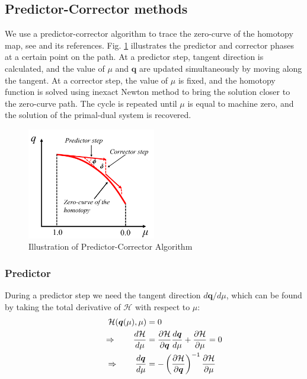 \documentclass{article}
\theoremstyle{definition}
\begin{document}



\subsection{Predictor-Corrector methods}
We use a predictor-corrector algorithm to trace the zero-curve of the homotopy map, see \cite{allgower_georg_1993} and its references. Fig. \ref{fig:pc} illustrates the predictor and corrector phases at a certain point on the path. At a predictor step, tangent direction is calculated, and the value of $\mu$ and $\boldsymbol{q}$ are updated simultaneously by moving along the tangent. At a corrector step, the value of $\mu$ is fixed, and the homotopy function is solved using inexact Newton method to bring the solution closer to the zero-curve path. The cycle is repeated until $\mu$ is equal to machine zero, and the solution of the primal-dual system is recovered.

\begin{figure}[H]
  \centering
  \includegraphics[width=0.5\textwidth]{./figs/PC_graph.png}
  \caption{Illustration of Predictor-Corrector Algorithm}
  \label{fig:pc}
\end{figure}

\subsubsection{Predictor}
During a predictor step we need the tangent direction $d\boldsymbol{q}/d\mu$, which can be found by taking the total derivative of $\mathcal{H}$ with respect to $\mu$:
\begin{align}\label{eq:pctan}
\ \ \qquad \mathcal{H}(\boldsymbol{q}(\mu), \mu) &= 0 \notag \\
\Rightarrow \qquad \frac{d \mathcal{H} }{d \mu} &= 
\frac{\partial \mathcal{H}}{\partial \boldsymbol{q}} \frac{d \boldsymbol{q} }{d \mu} + \frac{\partial \mathcal{H}}{\partial \mu} = 0  \notag \\
\Rightarrow \qquad \frac{d \boldsymbol{q} }{d \mu} &= - \left( \frac{\partial \mathcal{H}}{\partial \boldsymbol{q}}\right)^{-1} \frac{\partial \mathcal{H}}{\partial \mu}  
\end{align}
\end{document}
